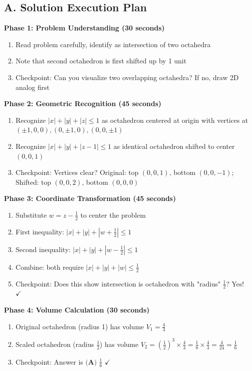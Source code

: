 \documentclass[11pt]{article}
\begin{document}
\begin{roadmapbox}
\subsection*{A. Solution Execution Plan}

\textbf{Phase 1: Problem Understanding (30 seconds)}
\begin{enumerate}[leftmargin=*]
    \item Read problem carefully, identify as intersection of two octahedra
    \item Note that second octahedron is first shifted up by 1 unit
    \item Checkpoint: Can you visualize two overlapping octahedra? If no, draw 2D analog first
\end{enumerate}

\textbf{Phase 2: Geometric Recognition (45 seconds)}
\begin{enumerate}[leftmargin=*]
    \item Recognize $|x|+|y|+|z|\le1$ as octahedron centered at origin with vertices at $(\pm1,0,0), (0,\pm1,0), (0,0,\pm1)$
    \item Recognize $|x|+|y|+|z-1|\le1$ as identical octahedron shifted to center $(0,0,1)$
    \item Checkpoint: Vertices clear? Original: top $(0,0,1)$, bottom $(0,0,-1)$; Shifted: top $(0,0,2)$, bottom $(0,0,0)$
\end{enumerate}

\textbf{Phase 3: Coordinate Transformation (45 seconds)}
\begin{enumerate}[leftmargin=*]
    \item Substitute $w = z - \frac{1}{2}$ to center the problem
    \item First inequality: $|x|+|y|+|w+\frac{1}{2}|\le1$
    \item Second inequality: $|x|+|y|+|w-\frac{1}{2}|\le1$
    \item Combine: both require $|x|+|y|+|w| \le \frac{1}{2}$
    \item Checkpoint: Does this show intersection is octahedron with "radius" $\frac{1}{2}$? Yes! $\checkmark$
\end{enumerate}

\textbf{Phase 4: Volume Calculation (30 seconds)}
\begin{enumerate}[leftmargin=*]
    \item Original octahedron (radius 1) has volume $V_1 = \frac{4}{3}$
    \item Scaled octahedron (radius $\frac{1}{2}$) has volume $V_2 = (\frac{1}{2})^3 \times \frac{4}{3} = \frac{1}{8} \times \frac{4}{3} = \frac{4}{24} = \frac{1}{6}$
    \item Checkpoint: Answer is $\boxed{\textbf{(A) } \frac{1}{6}}$ $\checkmark$
\end{enumerate}


\end{roadmapbox}
\end{document}
